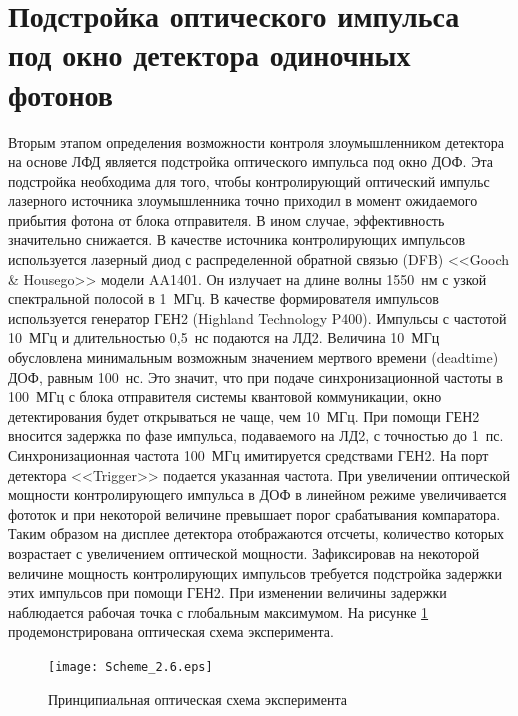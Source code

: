 
\section{Подстройка оптического импульса под окно детектора одиночных фотонов} \label{sec:ch2/sec6}

Вторым этапом определения возможности контроля злоумышленником детектора на основе ЛФД является подстройка оптического импульса под окно ДОФ. Эта подстройка необходима для того, чтобы контролирующий оптический импульс лазерного источника злоумышленника точно приходил в момент ожидаемого прибытия фотона от блока отправителя. В ином случае, эффективность значительно снижается. В качестве источника контролирующих импульсов используется лазерный диод с распределенной обратной связью (DFB) <<Gooch \& Housego>> модели AA1401. Он излучает на длине волны 1550~нм с узкой спектральной полосой в 1~МГц. В качестве формирователя импульсов используется генератор ГЕН2 (Highland Technology P400). Импульсы с частотой 10~МГц и длительностью 0,5~нс подаются на ЛД2. Величина 10~МГц обусловлена минимальным возможным значением мертвого времени (deadtime) ДОФ, равным 100~нс. Это значит, что при подаче синхронизационной частоты в 100~МГц с блока отправителя системы квантовой коммуникации, окно детектирования будет открываться не чаще, чем 10~МГц. При помощи ГЕН2 вносится задержка по фазе импульса, подаваемого на ЛД2, с точностью до 1~пс. Синхронизационная частота 100~МГц имитируется средствами ГЕН2. На порт детектора <<Trigger>> подается указанная частота. При увеличении оптической мощности контролирующего импульса в ДОФ в линейном режиме увеличивается фототок и при некоторой величине превышает порог срабатывания компаратора. Таким образом на дисплее детектора отображаются отсчеты, количество которых возрастает с увеличением оптической мощности. Зафиксировав на некоторой величине мощность контролирующих импульсов требуется подстройка задержки этих импульсов при помощи ГЕН2. При изменении величины задержки наблюдается рабочая точка с глобальным максимумом. На рисунке \ref{fig:Scheme_2.6} продемонстрирована оптическая схема эксперимента.

 \begin{figure}[ht]
  \centering
  \texttt{[image: Scheme\_2.6.eps]}
  \caption{Принципиальная оптическая схема эксперимента}
  \label{fig:Scheme_2.6}
\end{figure}

